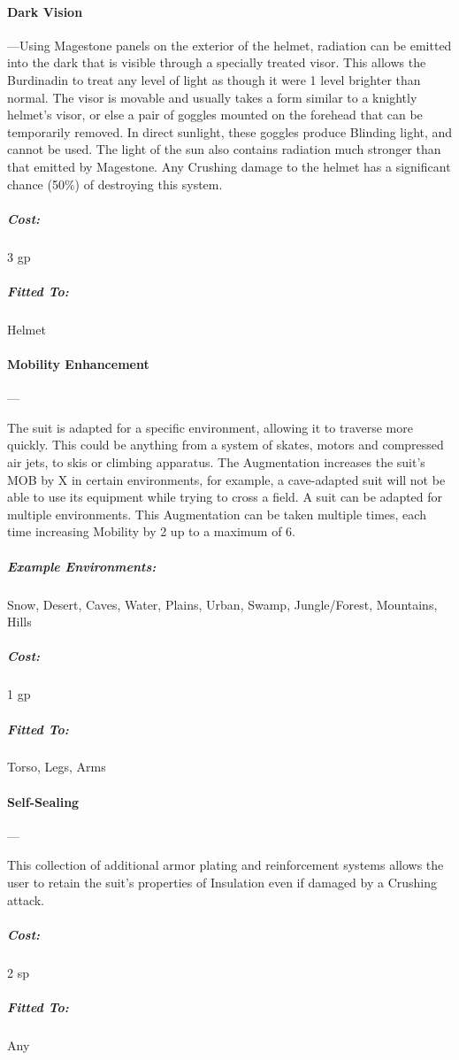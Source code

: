 \documentclass[oneside,11pt,english]{book}
\begin{document}
\paragraph{Dark Vision}---\quad[2]
Using Magestone panels on the exterior of the helmet, radiation can be emitted into the dark that is visible 
through a specially treated visor. This allows the Burdinadin to treat any level of light as though it were 1 
level brighter than normal. The visor is movable and usually takes a form similar to a knightly helmet’s 
visor, or else a pair of goggles mounted on the forehead that can be temporarily removed. In direct 
sunlight, these goggles produce Blinding light, and cannot be used. The light of the sun also contains 
radiation much stronger than that emitted by Magestone. Any Crushing damage to the helmet has a 
significant chance (50\%) of destroying this system.
\vspace{-15pt}\subparagraph{Cost:} 3 gp
\vspace{-15pt}\subparagraph{Fitted To:} Helmet

\paragraph{Mobility Enhancement}---\quad[1]

The suit is adapted for a specific environment, allowing it to traverse more quickly. This could be 
anything from a system of skates, motors and compressed air jets, to skis or climbing apparatus. The 
Augmentation increases the suit’s MOB by X in certain environments, for example, a cave-adapted suit 
will not be able to use its equipment while trying to cross a field. A suit can be adapted for multiple 
environments. This Augmentation can be taken multiple times, each time increasing Mobility by 2 up to a 
maximum of 6.
\vspace{-20pt}\subparagraph{Example Environments:} Snow, Desert, Caves, Water, Plains, Urban, Swamp, Jungle/Forest, Mountains, Hills

\vspace{-15pt}\subparagraph{Cost:} 1 gp
\vspace{-15pt}\subparagraph{Fitted To:} Torso, Legs, Arms

\paragraph{Self-Sealing}---\quad[1]

This collection of additional armor plating and reinforcement systems allows the user to retain the suit’s 
properties of Insulation even if damaged by a Crushing attack. 
\vspace{-15pt}\subparagraph{Cost:} 2 sp
\vspace{-15pt}\subparagraph{Fitted To:} Any
\end{document}
